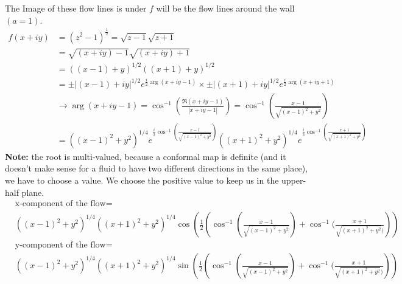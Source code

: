 \begin{example}
    The Image of these flow lines is under $f$ will be the flow lines around the wall $(a = 1)$.
    \begin{align*}
        f(x + iy) & = (z^2 - 1)^{\frac{1}2} = \sqrt{z -1}\sqrt{z + 1}                                                                                                                \\
                  & = \sqrt{(x + iy) - 1}\sqrt{(x + iy) + 1}                                                                                                                         \\
                  & = ((x -1) + y)^{1/2}((x+1) + y)^{1/2}                                                                                                                            \\
                  & = \pm|(x -1) + iy|^{1/2}e^{\frac{i}2\arg(x + iy - 1)}\times \pm|(x+1) + iy|^{1/2}e^{\frac{i}2\arg(x + iy + 1)}                                                   \\
                  & \rightarrow \arg(x + iy - 1) = \cos^{-1}\left(\frac{\Re(x + iy - 1)}{|x + iy - 1|}\right) = \cos^{-1}\left(\frac{x -1}{\sqrt{(x-1)^2 + y^2}}\right)              \\
                  & = ((x -1)^2 + y^2)^{1/4}e^{\frac{i}2\cos^{-1}(\frac{x -1}{\sqrt{(x-1)^2 + y^2}})}((x+1)^2 + y^2)^{1/4}e^{\frac{i}2\cos^{-1}(\frac{x + 1}{\sqrt{(x+1)^2 + y^2}})}
    \end{align*}
    \textbf{Note:} the root is multi-valued, because a conformal map is definite (and it doesn't make sense for a fluid to have two different directions in the same place), we have to choose a value. We choose the positive value to keep us in the upper-half plane.
    \begin{align*}
         & \text{x-component of the flow} =                                                                                                                                    \\
         & ((x- 1)^2 + y^2)^{1/4}((x+1)^2 + y^2)^{1/4}\cos(\frac{1}2\left(\cos^{-1}(\frac{x -1}{\sqrt{(x-1)^2 + y^2}}) + \cos^{-1}(\frac{x + 1}{\sqrt{(x+1)^2 + y^2})}\right)) \\
         & \text{y-component of the flow} =                                                                                                                                    \\
         & ((x- 1)^2 + y^2)^{1/4}((x+1)^2 + y^2)^{1/4}\sin(\frac{1}2\left(\cos^{-1}(\frac{x -1}{\sqrt{(x-1)^2 + y^2}}) + \cos^{-1}(\frac{x + 1}{\sqrt{(x+1)^2 + y^2})}\right))
    \end{align*}


\end{example}
